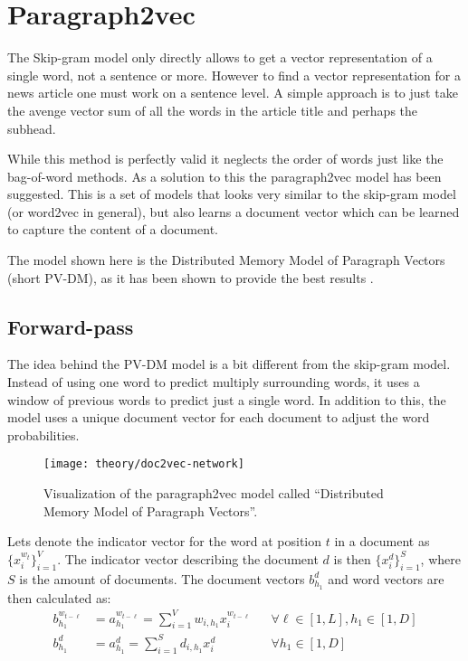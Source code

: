 
\section{Paragraph2vec}

The Skip-gram model only directly allows to get a vector representation of a single word, not a sentence or more. However to find a vector representation for a news article one must work on a sentence level. A simple approach is to just take the avenge vector sum of all the words in the article title and perhaps the subhead.

While this method is perfectly valid it neglects the order of words just like the bag-of-word methods. As a solution to this the paragraph2vec model has been suggested. This is a set of models that looks very similar to the skip-gram model (or word2vec in general), but also learns a document vector which can be learned to capture the content of a document.

The model shown here is the Distributed Memory Model of Paragraph Vectors (short PV-DM), as it has been shown to provide the best results \cite{doc2vec}. 

\subsection{Forward-pass}

The idea behind the PV-DM model is a bit different from the skip-gram model. Instead of using one word to predict multiply surrounding words, it uses a window of previous words to predict just a single word. In addition to this, the model uses a unique document vector for each document to adjust the word probabilities.

\begin{figure}[H]
	\centering
	\texttt{[image: theory/doc2vec-network]}
	\caption{Visualization of the paragraph2vec model called ``Distributed Memory Model of Paragraph Vectors''.}
	\label{fig:theory:doc2vec:network}
\end{figure}

Lets denote the indicator vector for the word at position $t$ in a document as $\{x_i^{w_t}\}_{i=1}^V$. The indicator vector describing the document $d$ is then $\{x_i^d\}_{i=1}^S$, where $S$ is the amount of documents. The document vectors $b_{h_1}^d$ and word vectors are then calculated as:
\begin{equation}
\begin{aligned}
b_{h_1}^{w_{t-\ell}} &= a_{h_1}^{w_{t-\ell}} = \sum_{i=1}^V w_{i,h_1} x_{i}^{w_{t-\ell}} && \forall \ell \in [1, L], h_1 \in [1, D] \\
b_{h_1}^d &= a_{h_1}^d = \sum_{i=1}^S d_{i,h_1} x_{i}^d && \forall h_1 \in [1, D]
\end{aligned}
\end{equation}

